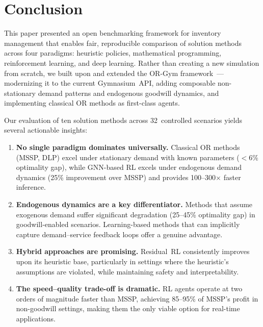 
\section{Conclusion}\label{sec:conclusion}

This paper presented an open benchmarking framework for inventory
management that enables fair, reproducible comparison of solution
methods across four paradigms: heuristic policies, mathematical
programming, reinforcement learning, and deep learning. Rather than
creating a new simulation from scratch, we built upon and extended the
OR-Gym framework~\citep{hubbs2020orgym}---modernizing it to the
current Gymnasium~API, adding composable non-stationary demand
patterns and endogenous goodwill dynamics, and implementing classical
OR methods as first-class agents.

Our evaluation of ten solution methods across 32~controlled scenarios
yields several actionable insights:

\begin{enumerate}
  \item \textbf{No single paradigm dominates universally.} Classical
        OR methods (MSSP, DLP) excel under stationary demand with
        known parameters ($<6\%$ optimality gap), while GNN-based RL
        excels under endogenous demand dynamics (25\% improvement over
        MSSP) and provides 100--300$\times$ faster inference.

  \item \textbf{Endogenous dynamics are a key differentiator.} Methods
        that assume exogenous demand suffer significant degradation
        (25--45\% optimality gap) in goodwill-enabled scenarios.
        Learning-based methods that can implicitly capture
        demand--service feedback loops offer a genuine advantage.

  \item \textbf{Hybrid approaches are promising.} Residual~RL
        consistently improves upon its heuristic base, particularly
        in settings where the heuristic's assumptions are violated,
        while maintaining safety and interpretability.

  \item \textbf{The speed--quality trade-off is dramatic.} RL agents
        operate at two orders of magnitude faster than MSSP,
        achieving 85--95\% of MSSP's profit in non-goodwill settings,
        making them the only viable option for real-time applications.
\end{enumerate}

